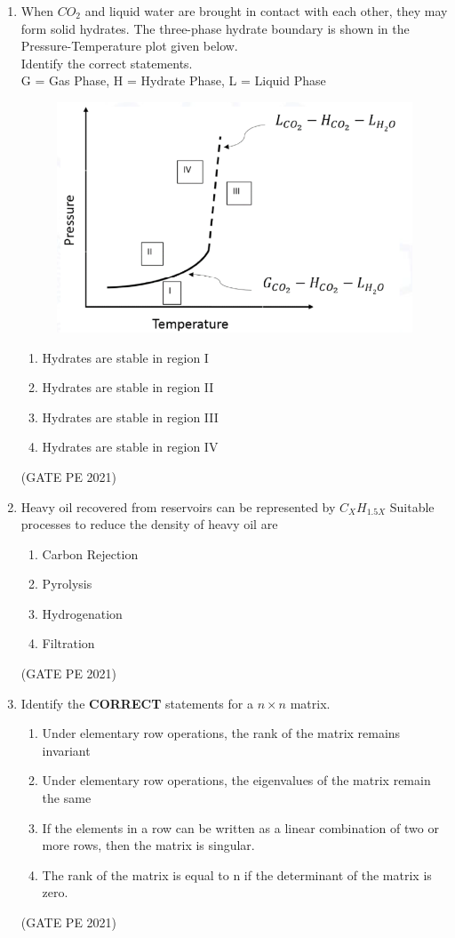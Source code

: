 \documentclass[journal,12pt,onecolumn]{IEEEtran}
\theoremstyle{remark}
\begin{document}
\begin{enumerate}
\item When $CO_2$ and liquid water are brought in contact with each other, they may form solid hydrates. The three-phase hydrate boundary is shown in the Pressure-Temperature plot given below.\\

Identify the correct statements.\\

G = Gas Phase, H = Hydrate Phase, L = Liquid Phase
\begin{figure}[h]
    \centering
    \includegraphics[width=0.5\columnwidth]{Q_16.png}
    \caption{}
    \label{fig:placeholder}
\end{figure}
\begin{enumerate}
    \item Hydrates are stable in region I
    \item Hydrates are stable in region II
    \item Hydrates are stable in region III
    \item Hydrates are stable in region IV
\end{enumerate}
\hfill{(GATE PE 2021)}

\item Heavy oil recovered from reservoirs can be represented by $C_XH_{1.5X}$ Suitable processes to reduce the density of heavy oil are
\begin{enumerate}
    \item Carbon Rejection
    \item Pyrolysis
    \item Hydrogenation
    \item Filtration
\end{enumerate}
\hfill{(GATE PE 2021)}

\item Identify the \textbf{CORRECT} statements for a $n\times n$ matrix.
\begin{enumerate}
    \item Under elementary row operations, the rank of the matrix remains invariant
    \item Under elementary row operations, the eigenvalues of the matrix remain the same
    \item  If the elements in a row can be written as a linear combination of two or more rows, then the matrix is singular.
    \item The rank of the matrix is equal to n if the determinant of the matrix is zero.
\end{enumerate}
\hfill{(GATE PE 2021)}


\end{enumerate}
\end{document}

